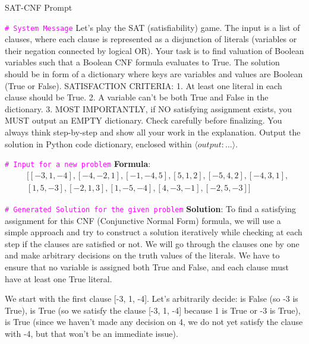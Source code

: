\documentclass{article} %
\begin{document}
\begin{mybox}[label=table: sat-cnf example]{SAT-CNF Prompt}
\footnotesize

\textcolor{magenta}{\texttt{\# System Message}}\newline
Let's play the SAT (satisfiability) game. The input is a list of clauses, where each clause is represented as a disjunction of literals (variables or their negation connected by logical OR). Your task is to find valuation of Boolean variables such that a Boolean CNF formula evaluates to True. The solution should be in form of a dictionary where keys are variables and values are Boolean (True or False). SATISFACTION CRITERIA: 1. At least one literal in each clause should be True. 2. A variable can't be both True and False in the dictionary. 3. MOST IMPORTANTLY, if NO satisfying assignment exists, you MUST output an EMPTY dictionary. Check carefully before finalizing. You always think step-by-step and show all your work in the explanation. Output the solution in Python code dictionary, enclosed within $\langle output: {...}\rangle$.\newline

\textcolor{magenta}{\texttt{\# Input for a new problem}}\newline
\textbf{Formula}: \begin{align*}
&[[-3, 1, -4], [-4, -2, 1], [-1, -4, 5], [5, 1, 2], [-5, 4, 2], [-4, 3, 1], \\
&[1, 5, -3], [-2, 1, 3], [1, -5, -4], [4, -3, -1], [-2, 5, -3]]
\end{align*}\newline

\textcolor{magenta}{\texttt{\# Generated Solution for the given problem}}\newline
\textbf{Solution}: To find a satisfying assignment for this CNF (Conjunctive Normal Form) formula, we will use a simple approach and try to construct a solution iteratively while checking at each step if the clauses are satisfied or not. We will go through the clauses one by one and make arbitrary decisions on the truth values of the literals. We have to ensure that no variable is assigned both True and False, and each clause must have at least one True literal.\newline

We start with the first clause [-3, 1, -4]. Let's arbitrarily decide: is False (so -3 is True), is True (so we satisfy the clause [-3, 1, -4] because 1 is True or -3 is True), is True (since we haven't made any decision on 4, we do not yet satisfy the clause with -4, but that won't be an immediate issue).\newline


\end{mybox}
\end{document}
